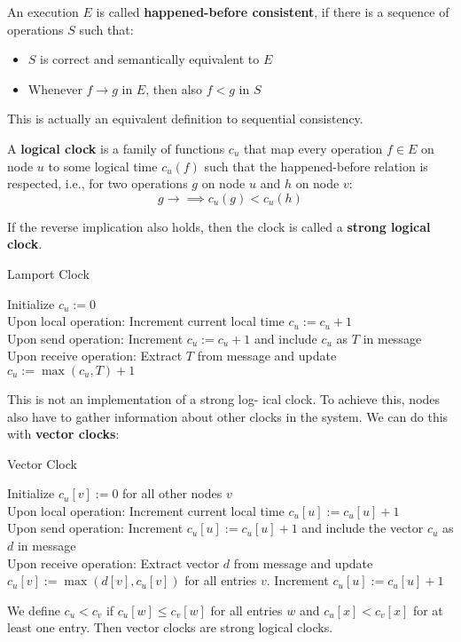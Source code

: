 An execution $E$ is called \textbf{happened-before consistent}, if there is a sequence of operations $S$ such that:
\begin{itemize}
	\item $S$ is correct and semantically equivalent to $E$
	\item Whenever $f \to g$ in $E$, then also $f<g$ in $S$
\end{itemize}

This is actually an equivalent definition to sequential consistency. \medskip

A \textbf{logical clock} is a family of functions $c_u$ that map every operation $f \in E$ on node $u$ to some logical time $c_u(f)$ such that the happened-before relation is respected, i.e., for two operations $g$ on node $u$ and $h$ on node $v$:
$$g \to \implies c_u(g) < c_u(h)$$

If the reverse implication also holds, then the clock is called a \textbf{strong logical clock}. \medskip

\begin{algorithm}[H]
\caption{Lamport Clock}
	Initialize $c_u := 0$ \\
	Upon local operation: Increment current local time $c_u := c_u + 1$ \\
	Upon send operation: Increment $c_u := c_u + 1$ and include $c_u$ as $T$ in message \\
	Upon receive operation: Extract $T$ from message and update $c_u := \max (c_u,T) + 1$
\end{algorithm}
\medskip

This is not an implementation of a strong log- ical clock. To achieve this, nodes also have to gather information about other clocks in the system. We can do this with \textbf{vector clocks}: \medskip

\begin{algorithm}[H]
\caption{Vector Clock}
	Initialize $c_u[v] := 0$ for all other nodes $v$ \\
	Upon local operation: Increment current local time $c_u[u] := c_u[u] + 1$ \\
	Upon send operation: Increment $c_u[u] := c_u[u] + 1$ and include the vector $c_u$ as $d$ in message \\
	Upon receive operation: Extract vector $d$ from message and update $c_u[v] := \max (d[v], c_u[v])$ for all entries $v$. Increment $c_u[u] := c_u[u] + 1$
\end{algorithm}
\medskip

We define $c_u < c_v$ if $c_u[w] \leq c_v[w]$ for all entries $w$ and $c_u[x] < c_v[x]$ for at least one entry. Then vector clocks are strong logical clocks. \medskip

